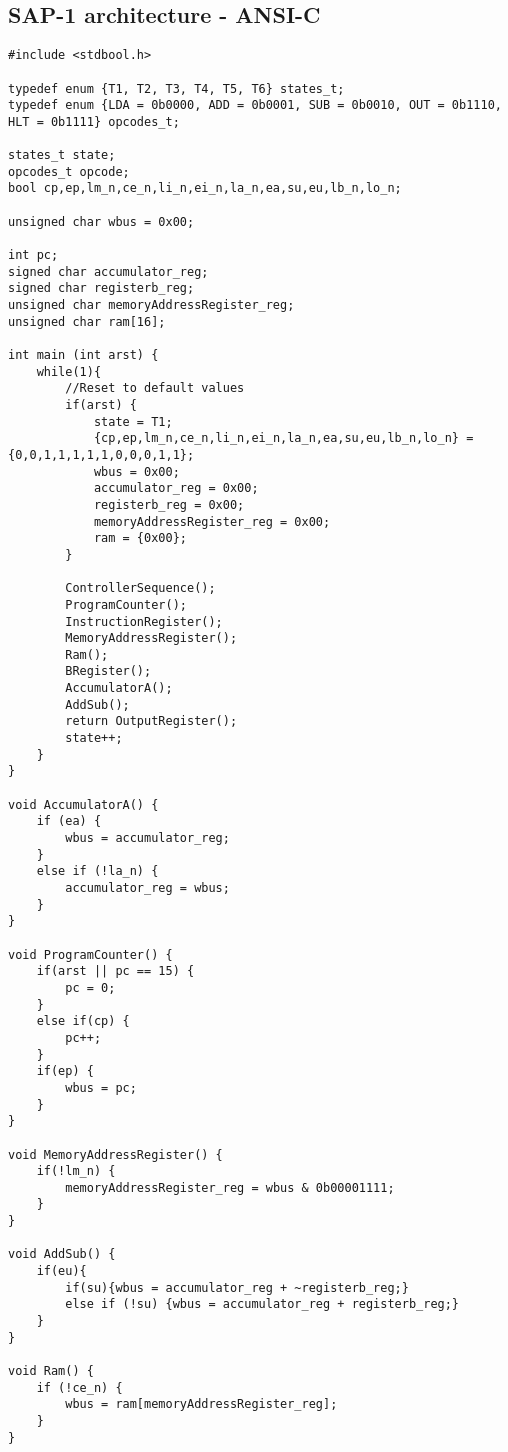 \subsection{SAP-1 architecture - ANSI-C}
\lstset{language=C,style=Cstyle}
\begin{lstlisting}[caption={SAP-1 architecture implemented in C},label=lst:sap1archc]
#include <stdbool.h>

typedef enum {T1, T2, T3, T4, T5, T6} states_t;
typedef enum {LDA = 0b0000, ADD = 0b0001, SUB = 0b0010, OUT = 0b1110, HLT = 0b1111} opcodes_t;

states_t state;
opcodes_t opcode;
bool cp,ep,lm_n,ce_n,li_n,ei_n,la_n,ea,su,eu,lb_n,lo_n; 
 
unsigned char wbus = 0x00;

int pc;
signed char accumulator_reg;
signed char registerb_reg;
unsigned char memoryAddressRegister_reg;
unsigned char ram[16];
 
int main (int arst) {
	while(1){
		//Reset to default values
		if(arst) {
			state = T1;
			{cp,ep,lm_n,ce_n,li_n,ei_n,la_n,ea,su,eu,lb_n,lo_n} = {0,0,1,1,1,1,1,0,0,0,1,1};
			wbus = 0x00;
			accumulator_reg = 0x00;
			registerb_reg = 0x00;
			memoryAddressRegister_reg = 0x00;
			ram = {0x00};
		}
		
		ControllerSequence();
		ProgramCounter();
		InstructionRegister();
		MemoryAddressRegister();
		Ram();
		BRegister();
		AccumulatorA();
		AddSub();
		return OutputRegister();
		state++;
	}
}

void AccumulatorA() {
	if (ea) {
		wbus = accumulator_reg;
	}
	else if (!la_n) {
		accumulator_reg = wbus;
	}
}

void ProgramCounter() {
	if(arst || pc == 15) {
		pc = 0;
	}
	else if(cp) {
		pc++;
	}
	if(ep) {
		wbus = pc;
	}
}

void MemoryAddressRegister() {
	if(!lm_n) {
		memoryAddressRegister_reg = wbus & 0b00001111;
	}
}

void AddSub() {
	if(eu){
		if(su){wbus = accumulator_reg + ~registerb_reg;}
		else if (!su) {wbus = accumulator_reg + registerb_reg;}
	}
}

void Ram() {
	if (!ce_n) {
		wbus = ram[memoryAddressRegister_reg];
	}
}


\end{lstlisting}
